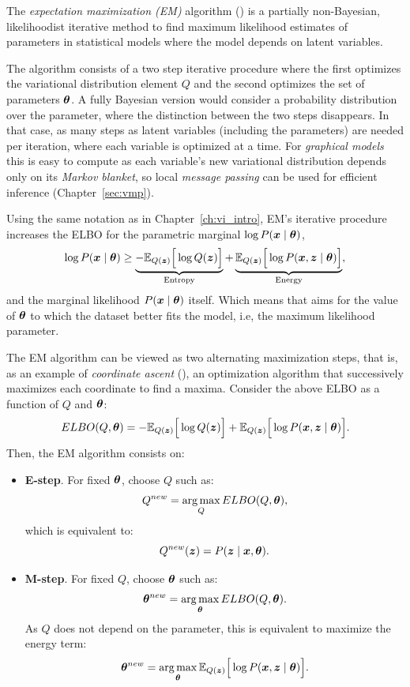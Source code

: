 
The \emph{expectation maximization (EM)} algorithm (\cite{dempster1977maximum,mclachlan2007algorithm, bishop2006pattern}) is a partially non-Bayesian, likelihoodist iterative method to find maximum likelihood estimates of parameters in statistical models where the model depends on latent variables.

The algorithm consists of a two step iterative procedure where the first optimizes the variational distribution element \(Q\)  and the second optimizes the set of parameters \(\bm{\theta}\). A fully Bayesian version would consider a probability distribution over the parameter, where the distinction between the two steps disappears. In that case, as many steps as latent variables (including the parameters) are needed per iteration, where each variable is optimized at a time. For \emph{graphical models} this is easy to compute as each variable's new variational distribution depends only on its \emph{Markov blanket}, so local \emph{message passing} can be used for efficient inference (Chapter~\ref{sec:vmp}).

Using the same notation as in Chapter~\ref{ch:vi_intro}, EM's iterative procedure increases the ELBO for the parametric marginal \(\log P(\bm{x} \mid \bm{\theta})\),
\[
  \log{P(\bm{x}\mid \bm{\theta})} \geq \underbrace{-\mathbb{E}_{Q(\bm{z})}\Big[\log{Q(\bm{z})}\Big]}_{\text{Entropy}} + \underbrace{\mathbb{E}_{Q(\bm{z})}\Big[\log{P(\bm{x}, \bm{z}\mid \bm{\theta})}\Big]}_{\text{Energy}},
\]
and the marginal likelihood \(P(\bm{x} \mid \bm{\theta})\) itself. Which means that aims for the value of \(\bm{\theta}\) to which the dataset better fits the model, i.e, the maximum likelihood parameter.


The EM algorithm can be viewed as two alternating maximization steps, that is, as an example of \emph{coordinate ascent} (\cite{neal1998view}), an optimization algorithm that successively maximizes each coordinate to find a maxima. Consider the above ELBO as a function of \(Q\) and \(\bm{\theta}\):
\[
  ELBO(Q, \bm{\theta}) = -\mathbb{E}_{Q(\bm{z})}\Big[\log{Q(\bm{z})}\Big] + \mathbb{E}_{Q(\bm{z})}\Big[\log{P(\bm{x}, \bm{z}\mid \bm{\theta})}\Big].
\]
Then, the EM algorithm consists on:
\begin{itemize}
  \item \textbf{E-step}. For fixed \(\bm{\theta}\), choose \(Q\) such as:
    \[
    Q^{new} = \operatorname*{arg\,max}_{Q}ELBO(Q, \bm{\theta}),
    \]
    which is equivalent to:
    \[
    Q^{new}(\bm{z}) = P(\bm{z} \mid \bm{x} , \bm{\theta}).
    \]
  \item \textbf{M-step}. For fixed \(Q\), choose \(\bm{\theta}\) such as:
    \[
    \bm{\theta}^{new} = \operatorname*{arg\,max}_{\bm{\theta}}ELBO(Q, \bm{\theta}).
    \]
    As \(Q\) does not depend on the parameter, this is equivalent to maximize the energy term:
    \[
    \bm{\theta}^{new} = \operatorname*{arg\,max}_{\bm{\theta}} \mathbb{E}_{Q(\bm{z})}\Big[\log{P(\bm{x}, \bm{z}\mid \bm{\theta})}\Big].
    \]
\end{itemize}

